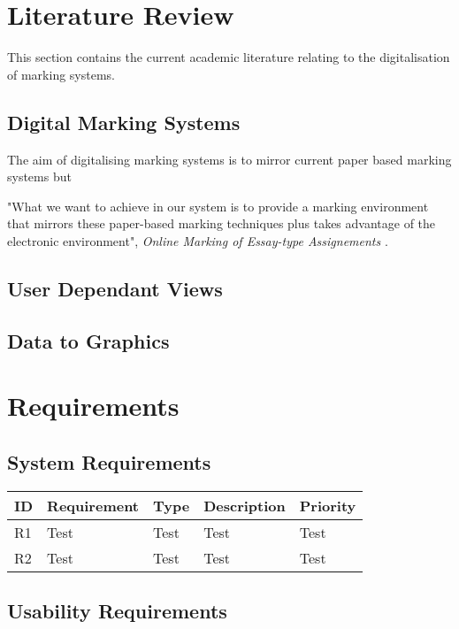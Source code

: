 \documentclass[12pt]{article}  %
\theoremstyle{definition}
\theoremstyle{remark}
\begin{document}
\newpage
\section{Literature Review}

This section contains the current academic literature relating to the digitalisation of marking systems. 
\subsection{Digital Marking Systems}
The aim of digitalising marking systems is to mirror current paper based marking systems but  \cite{EssayType}

"What we want to achieve in our system is to provide a marking environment that mirrors these paper-based marking techniques plus takes advantage of the electronic environment", \textit{Online Marking of Essay-type Assignements} \cite{EssayType}.


\subsection{User Dependant Views}


\subsection{Data to Graphics}

\newpage
\section{Requirements}
\subsection{System Requirements}


\begin{tabularx}{\textwidth}{|l|X|X|X|X|}
\hline
  \textbf{ID} & \textbf{Requirement} & \textbf{Type} & \textbf{Description} & \textbf{Priority} 
\\
\hline
R1&Test&Test&Test&Test\\ \hline
R2&Test&Test&Test&Test\\ \hline


\end{tabularx}

\subsection{Usability Requirements}
\end{document}
